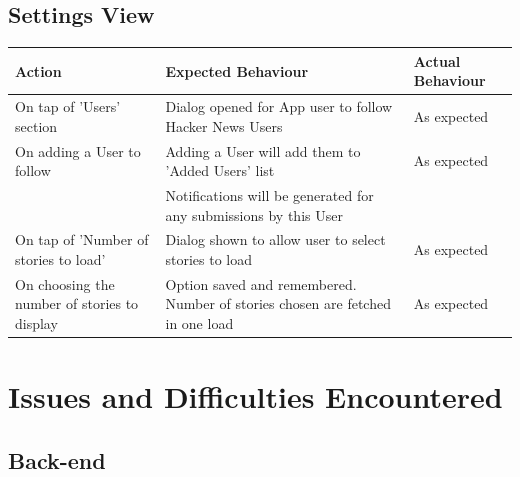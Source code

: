 \documentclass[11pt]{article}
\begin{document}
\subsection*{Settings View}
\begin{center}
\begin{tabular}{ | p{5cm} | p{5cm} | p{5cm} |}
	\hline
	\textbf{Action} & \textbf{Expected Behaviour} & \textbf{Actual Behaviour} \\
	\hline	
	On tap of 'Users' section & Dialog opened for App user to follow Hacker News Users & As expected \\
	\hline
	On adding a User to follow & Adding a User will add them to 'Added Users' list & As expected \\ & Notifications will be generated for any submissions by this User & \\
	\hline
	On tap of 'Number of stories to load' & Dialog shown to allow user to select stories to load & As expected \\
	\hline
	On choosing the number of stories to display & Option saved and remembered. Number of stories chosen are fetched in one load & As expected \\
	\hline
\end{tabular}
\end{center}

\section*{Issues and Difficulties Encountered}

\subsection*{Back-end}
\end{document}

